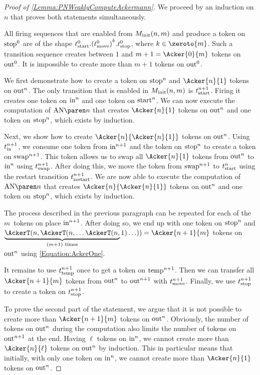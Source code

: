 \documentclass[../../diss.tex]{subfiles}
\begin{document}
\begin{proof}[Proof of \cref{Lemma:PNWeaklyComputeAckermann}]
    We proceed by an induction on $n$ that proves both statements simultaneously.


    All firing sequences that are enabled from $M_{\text{init}}(n,m)$ and produce a token on $\text{stop}^0$ are of the shape $t_\text{start}^0.{(t_\text{move}^0)}^k.t_\text{stop}^0$, where $k \in \zeroto{m}$.
    Such a transition sequence creates between $1$ and $m+1 = \Acker{0}{m}$ tokens on $\text{out}^0$.
    It is impossible to create more than $m+1$ tokens on $\text{out}^0$.


    We first demonstrate how to create a token on $\text{stop}^n$ and $\Acker{n}{1}$ tokens on $\text{out}^n$.
    The only transition that is enabled in $M_{\text{init}}(n,m)$ is $t_\text{start}^{n+1}$.
    Firing it creates one token on $\text{in}^n$ and one token on $\text{start}^n$.
    We can now execute the computation of $\AckerNet{n}$ that creates $\Acker{n}{1}$ tokens on $\text{out}^n$ and one token on $\text{stop}^n$, which exists by induction.

    Next, we show how to create $\Acker{n}{\Acker{n}{1}}$ tokens on $\text{out}^n$.
    Using $t_\text{in}^{n+1}$, we consume one token from $\text{in}^{n+1}$ and the token on $\text{stop}^n$ to create a token on $\text{swap}^{n+1}$.
    This token allows us to swap all $\Acker{n}{1}$ tokens from $\text{out}^{n}$ to $\text{in}^{n}$ using $t_\text{swap}^{n+1}$.
    After doing this, we move the token from $\text{swap}^{n+1}$ to $t_\text{start}^n$ using the restart transition $t_\text{restart}^{n+1}$.
    We are now able to execute the computation of $\AckerNet{n}$ that creates $\Acker{n}{\Acker{n}{1}}$ tokens on $\text{out}^n$ and one token on $\text{stop}^n$, which exists by induction.

    The process described in the previous paragraph can be repeated for each of the $m$~tokens on place $\text{in}^{n+1}$.
    After doing so, we end up with one token on $\text{stop}^n$ and
    $\underbrace{ \AckerT(n, \AckerT(n, \ldots \AckerT(n, }_{(m+1) \text{ times}} 1) \ldots )) = \Acker{n+1}{m}$ tokens on $\text{out}^n$ using \cref{Equation:AckerOne}.

    It remains to use $t_\text{temp}^{n+1}$ once to get a token on $\text{temp}^{n+1}$.
    Then we can transfer all $\Acker{n+1}{m}$ tokens from $\text{out}^n$ to $\text{out}^{n+1}$ with $t_\text{move}^{n+1}$.
    Finally, we use $t_\text{stop}^{n+1}$ to create a token on $t_\text{stop}^{n+1}$.

    To prove the second part of the statement, we argue that it is not possible to create more than $\Acker{n+1}{m}$ tokens on $\text{out}^n$.
    Obviously, the number of tokens on $\text{out}^n$ during the computation also limits the number of tokens on $\text{out}^{n+1}$ at the end.
    Having $\ell$ tokens on $\text{in}^n$, we cannot create more than $\Acker{n}{\ell}$ tokens on $\text{out}^n$ by induction.
    This in particular means that initially, with only one token on $\text{in}^n$, we cannot create more than $\Acker{n}{1}$ tokens on $\text{out}^{n}$.


\end{proof}
\end{document}
